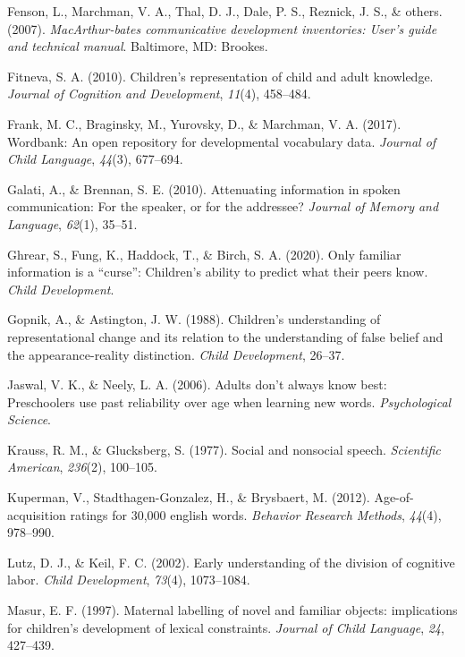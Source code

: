 \documentclass[10pt, letterpaper]{article}
\begin{document}
\leavevmode\hypertarget{ref-fenson2007}{}%
Fenson, L., Marchman, V. A., Thal, D. J., Dale, P. S., Reznick, J. S.,
\& others. (2007). \emph{MacArthur-bates communicative development
inventories: User's guide and technical manual}. Baltimore, MD: Brookes.

\leavevmode\hypertarget{ref-fitneva2010}{}%
Fitneva, S. A. (2010). Children's representation of child and adult
knowledge. \emph{Journal of Cognition and Development}, \emph{11}(4),
458--484.

\leavevmode\hypertarget{ref-frank2017}{}%
Frank, M. C., Braginsky, M., Yurovsky, D., \& Marchman, V. A. (2017).
Wordbank: An open repository for developmental vocabulary data.
\emph{Journal of Child Language}, \emph{44}(3), 677--694.

\leavevmode\hypertarget{ref-galati2010}{}%
Galati, A., \& Brennan, S. E. (2010). Attenuating information in spoken
communication: For the speaker, or for the addressee? \emph{Journal of
Memory and Language}, \emph{62}(1), 35--51.

\leavevmode\hypertarget{ref-ghrear2020}{}%
Ghrear, S., Fung, K., Haddock, T., \& Birch, S. A. (2020). Only familiar
information is a ``curse'': Children's ability to predict what their
peers know. \emph{Child Development}.

\leavevmode\hypertarget{ref-gopnik1988}{}%
Gopnik, A., \& Astington, J. W. (1988). Children's understanding of
representational change and its relation to the understanding of false
belief and the appearance-reality distinction. \emph{Child Development},
26--37.

\leavevmode\hypertarget{ref-jaswal2006}{}%
Jaswal, V. K., \& Neely, L. A. (2006). Adults don't always know best:
Preschoolers use past reliability over age when learning new words.
\emph{Psychological Science}.

\leavevmode\hypertarget{ref-krauss1977}{}%
Krauss, R. M., \& Glucksberg, S. (1977). Social and nonsocial speech.
\emph{Scientific American}, \emph{236}(2), 100--105.

\leavevmode\hypertarget{ref-kuperman2012}{}%
Kuperman, V., Stadthagen-Gonzalez, H., \& Brysbaert, M. (2012).
Age-of-acquisition ratings for 30,000 english words. \emph{Behavior
Research Methods}, \emph{44}(4), 978--990.

\leavevmode\hypertarget{ref-lutz2002}{}%
Lutz, D. J., \& Keil, F. C. (2002). Early understanding of the division
of cognitive labor. \emph{Child Development}, \emph{73}(4), 1073--1084.

\leavevmode\hypertarget{ref-masur1997}{}%
Masur, E. F. (1997). Maternal labelling of novel and familiar objects:
implications for children's development of lexical constraints.
\emph{Journal of Child Language}, \emph{24}, 427--439.
\end{document}
